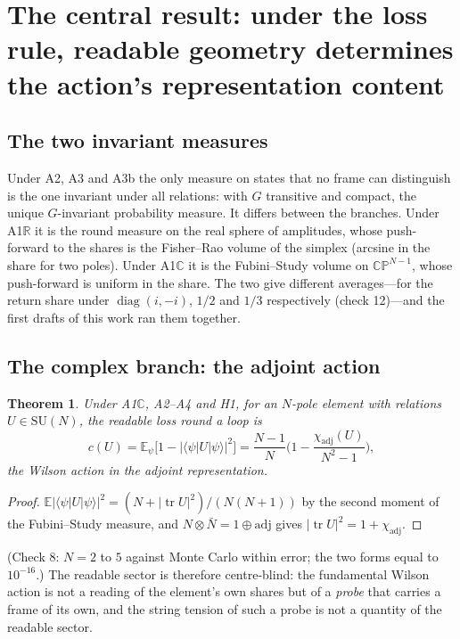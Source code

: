 \documentclass[11pt,a4paper]{article}
\theoremstyle{plain}
\newtheorem{theorem}{Theorem}
\theoremstyle{definition}
\theoremstyle{remark}
\newcommand{\tr}{\operatorname{tr}}
\newcommand{\E}{\mathbb{E}}
\newcommand{\R}{\mathbb{R}}
\newcommand{\C}{\mathbb{C}}
\newcommand{\CP}{\mathbb{CP}}
\newcommand{\SU}{\mathrm{SU}}
\newcommand{\adj}{\mathrm{adj}}
\newcommand{\diag}{\operatorname{diag}}
\begin{document}
\section{The central result: under the loss rule, readable geometry determines the action's representation content}\label{sec:central}

\subsection{The two invariant measures}

Under A2, A3 and A3b the only measure on states that no frame can distinguish is the one invariant under all relations: with $G$ transitive and compact, the unique $G$-invariant probability measure. It differs between the branches. Under A1$\R$ it is the round measure on the real sphere of amplitudes, whose push-forward to the shares is the Fisher--Rao volume of the simplex (arcsine in the share for two poles). Under A1$\C$ it is the Fubini--Study volume on $\CP^{N-1}$, whose push-forward is uniform in the share. The two give different averages---for the return share under $\diag(i,-i)$, $1/2$ and $1/3$ respectively (check 12)---and the first drafts of this work ran them together.

\subsection{The complex branch: the adjoint action}

\begin{theorem}\label{thm:adjoint}
Under A1$\C$, A2--A4 and H1, for an $N$-pole element with relations $U\in\SU(N)$, the readable loss round a loop is
\begin{equation}
c(U)=\E_\psi\big[1-|\langle\psi|U|\psi\rangle|^2\big]=\frac{N-1}{N}\Big(1-\frac{\chi_{\adj}(U)}{N^2-1}\Big),
\end{equation}
the Wilson action in the adjoint representation.
\end{theorem}
\begin{proof}
$\E|\langle\psi|U|\psi\rangle|^2=(N+|\tr U|^2)/(N(N+1))$ by the second moment of the Fubini--Study measure, and $N\otimes\bar N=1\oplus\adj$ gives $|\tr U|^2=1+\chi_{\adj}$.
\end{proof}
(Check 8: $N=2$ to $5$ against Monte Carlo within error; the two forms equal to $10^{-16}$.) The readable sector is therefore centre-blind: the fundamental Wilson action is not a reading of the element's own shares but of a \emph{probe} that carries a frame of its own, and the string tension of such a probe is not a quantity of the readable sector.
\end{document}
